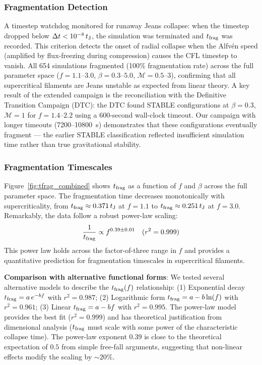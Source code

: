 \documentclass[twoside,twocolumn]{mnras}
\begin{document}
\subsubsection{Fragmentation Detection}

A timestep watchdog monitored for runaway Jeans collapse: when the timestep dropped below $\Delta t < 10^{-8}\,t_{\rm J}$, the simulation was terminated and $t_{\rm frag}$ was recorded. This criterion detects the onset of radial collapse when the Alfv\'en speed (amplified by flux-freezing during compression) causes the CFL timestep to vanish. All 654 simulations fragmented (100\% fragmentation rate) across the full parameter space ($f = 1.1$--$3.0$, $\beta = 0.3$--$5.0$, $\mathcal{M} = 0.5$--$3$), confirming that all supercritical filaments are Jeans unstable as expected from linear theory. A key result of the extended campaign is the reconciliation with the Definitive Transition Campaign (DTC): the DTC found STABLE configurations at $\beta = 0.3$, $\mathcal{M} = 1$ for $f = 1.4$--$2.2$ using a 600-second wall-clock timeout. Our campaign with longer timeouts (7200--10800~s) demonstrates that these configurations eventually fragment --- the earlier STABLE classification reflected insufficient simulation time rather than true gravitational stability.

\subsubsection{Fragmentation Timescales}

Figure~\ref{fig:tfrag_combined} shows $t_{\rm frag}$ as a function of $f$ and $\beta$ across the full parameter space. The fragmentation time decreases monotonically with supercriticality, from $t_{\rm frag} \approx 0.371\,t_{\rm J}$ at $f = 1.1$ to $t_{\rm frag} \approx 0.251\,t_{\rm J}$ at $f = 3.0$. Remarkably, the data follow a robust power-law scaling:
\begin{equation}
\frac{1}{t_{\rm frag}} \propto f^{0.39 \pm 0.01} \quad (r^2 = 0.999)
\end{equation}
This power law holds across the factor-of-three range in $f$ and provides a quantitative prediction for fragmentation timescales in supercritical filaments.

\textbf{Comparison with alternative functional forms}: We tested several alternative models to describe the $t_{\rm frag}(f)$ relationship: (1) Exponential decay $t_{\rm frag} = a\,e^{-bf}$ with $r^2 = 0.987$; (2) Logarithmic form $t_{\rm frag} = a - b\ln(f)$ with $r^2 = 0.961$; (3) Linear $t_{\rm frag} = a - bf$ with $r^2 = 0.995$. The power-law model provides the best fit ($r^2 = 0.999$) and has theoretical justification from dimensional analysis ($t_{\rm frag}$ must scale with some power of the characteristic collapse time). The power-law exponent $0.39$ is close to the theoretical expectation of $0.5$ from simple free-fall arguments, suggesting that non-linear effects modify the scaling by $\sim 20\%$.
\end{document}

